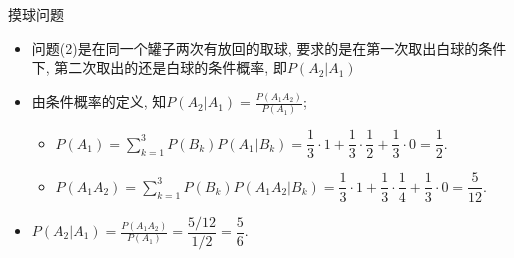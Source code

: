 \begin{frame}{摸球问题}
	\begin{itemize}[<+-|alert@+>]
	\item 问题(2)是在同一个罐子两次有放回的取球, 要求的是在第一次取出白球的条件下, 第二次取出的还是白球的条件概率, 即$P(A_2|A_1)$
	\item 由条件概率的定义, 知\pause $P(A_2|A_1)=\frac{P(A_1A_2)}{P(A_1)}$;\pause %
	\begin{itemize}[<+-|alert@+>]
		\item $P(A_1)=\sum\limits_{k=1}^{3}P(B_k)P(A_1|B_k)=\dfrac{1}{3}·1+\dfrac{1}{3}·\dfrac{1}{2}+\dfrac{1}{3}·0=\dfrac{1}{2}.$
		\item $P(A_1A_2)=\sum\limits_{k=1}^{3}P(B_k)P(A_1A_2|B_k)=\dfrac{1}{3}·1+\dfrac{1}{3}·\dfrac{1}{4}+\dfrac{1}{3}·0=\dfrac{5}{12}.$
	\end{itemize}
	\item 	$P(A_2|A_1)=\frac{P(A_1A_2)}{P(A_1)}=\dfrac{5/12}{1/2}=\dfrac{5}{6}.$
\end{itemize}
\end{frame}
